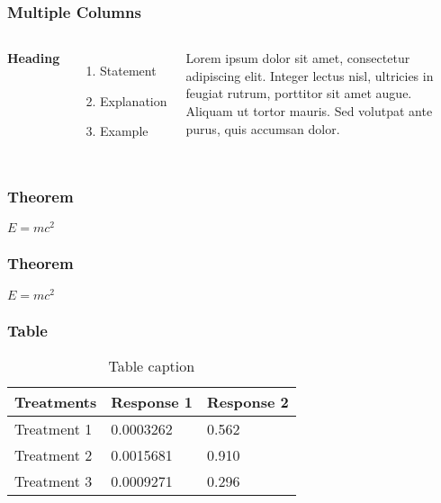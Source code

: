 \documentclass{beamer}
\begin{document}
\begin{frame}
\frametitle{Multiple Columns}
\begin{columns}[c] %

\textbf{Heading}
\begin{enumerate}
\item Statement
\item Explanation
\item Example
\end{enumerate}

Lorem ipsum dolor sit amet, consectetur adipiscing elit. Integer lectus nisl, ultricies in feugiat rutrum, porttitor sit amet augue. Aliquam ut tortor mauris. Sed volutpat ante purus, quis accumsan dolor.

\end{columns}
\end{frame}


\begin{frame}
\frametitle{Theorem}
\begin{theorem}
$E = mc^2$
\end{theorem}
\end{frame}


\begin{frame}
\frametitle{Theorem}
\begin{theorem}
$E = mc^2$
\end{theorem}
\end{frame}


\begin{frame}
\frametitle{Table}
\begin{table}
\begin{tabular}{l l l}
\toprule
\textbf{Treatments} & \textbf{Response 1} & \textbf{Response 2}\\
\midrule
Treatment 1 & 0.0003262 & 0.562 \\
Treatment 2 & 0.0015681 & 0.910 \\
Treatment 3 & 0.0009271 & 0.296 \\
\bottomrule
\end{tabular}
\caption{Table caption}
\end{table}
\end{frame}
\end{document}

